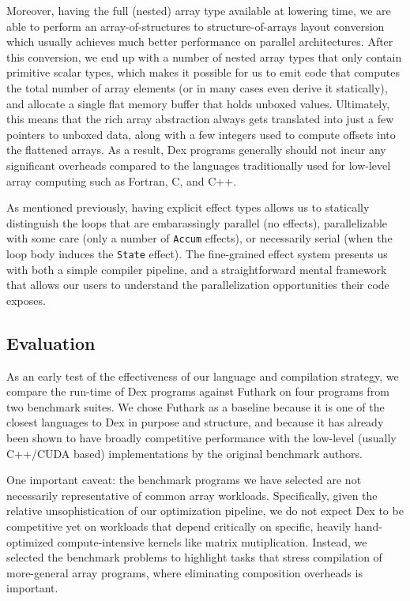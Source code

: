 \documentclass[acmsmall,screen,nonacm]{acmart}
\newcommand{\ExcessDetail}[1]{}
\begin{document}
Moreover, having the full (nested) array type available at lowering time, we are able to perform an array-of-structures to structure-of-arrays layout conversion which usually achieves much better performance on parallel architectures.
After this conversion, we end up with a number of nested array types that only contain primitive scalar types, which makes it possible for us to emit code that computes the total number of array elements (or in many cases even derive it statically), and allocate a single flat memory buffer that holds unboxed values.
Ultimately, this means that the rich array abstraction always gets translated into just a few pointers to unboxed data, along with a few integers used to compute offsets into the flattened arrays.
As a result, Dex programs generally should not incur any significant overheads compared to the languages traditionally used for low-level array computing such as Fortran, C, and C++.

As mentioned previously, having explicit effect types allows us to statically distinguish the loops that are embarassingly parallel (no effects), parallelizable with some care (only a number of \texttt{Accum} effects), or necessarily serial (when the loop body induces the \texttt{State} effect).
The fine-grained effect system presents us with both a simple compiler pipeline, and a straightforward mental framework that allows our users to understand the parallelization opportunities their code exposes.

\ExcessDetail{
Finally, type-checking the IR after every transformation has been invaluable for debugging the compiler.
}

\subsection{Evaluation}
\label{sec:benchmarks}

As an early test of the effectiveness of our language and compilation strategy, we compare the run-time of Dex programs against Futhark \cite{henriksen2017futhark} on four programs from two benchmark suites.
We chose Futhark as a baseline because it is one of the closest languages to Dex in purpose and structure, and because it has already been shown to have broadly competitive performance with the low-level (usually C++/CUDA based) implementations by the original benchmark authors.

One important caveat: the benchmark programs we have selected are not necessarily representative of common array workloads.
Specifically, given the relative unsophistication of our optimization pipeline, we do not expect Dex to be competitive yet on workloads that depend critically on specific, heavily hand-optimized compute-intensive kernels like matrix mutiplication.
Instead, we selected the benchmark problems to highlight tasks that stress compilation of more-general array programs, where eliminating composition overheads is important.
\end{document}
